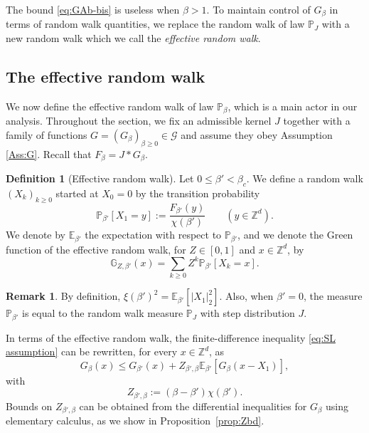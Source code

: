 \documentclass[11pt,a4paper]{article}
\numberwithin{equation}{section}
\theoremstyle{plain}
\theoremstyle{definition}
\newtheorem{Def}[Thm]{Definition}
\newtheorem{Rem}[Thm]{Remark}
\newcommand\1{\mathds{1}}
\begin{document}
The bound \eqref{eq:GAb-bis} is
useless
when $\beta>1$. To
maintain control of
$G_\beta$ in terms of random walk quantities, we replace the random walk of law $\mathbb P_J$ with a new random walk which we call the \emph{effective random walk}.


\subsection{The effective random walk}
\label{sec:strategy}

We now define the effective random walk of law $\mathbb P_\beta$,
which is a main actor in our analysis.
Throughout the section, we fix an admissible kernel $J$ together with a family of functions $G=(G_\beta)_{\beta\geq 0}\in \mathcal G$ and assume they obey Assumption \ref{Ass:G}.
Recall that $F_\beta=J*G_\beta$.


\begin{Def}[Effective random walk]\label{def: effective rw}
Let $0\leq\beta'<\beta_c$. We define a random walk $(X_k)_{k\geq 0}$ started at $X_0=0$ by the transition probability
\begin{equation}
    \mathbb P_{\beta'}[X_{1}=y]:=\frac{F_{\beta'}(y)}{\chi(\beta')}  \qquad (y\in \mathbb Z^d).
\end{equation}
We denote by $\mathbb E_{\beta'}$ the expectation with respect to $\mathbb P_{\beta'}$,
and we denote the Green function of the effective
random walk, for $Z\in [0,1]$ and $x\in \mathbb Z^d$, by
\begin{equation}
\label{eq:Green-effRW}
    \mathbb G_{Z,\beta'}(x)=\sum_{k\geq 0}Z^k \mathbb P_{\beta'}[X_k=x].
\end{equation}
\end{Def}

\begin{Rem} By definition, $\xi(\beta')^2=\mathbb E_{\beta'}[|X_1|_2^2]$.
Also, when $\beta'=0$, the measure $\mathbb P_{\beta'}$ is equal to the random walk measure $\mathbb P_J$ with step distribution $J$.
\end{Rem}

In terms of the effective random walk, the finite-difference inequality
\eqref{eq:SL assumption} can be rewritten, for every $x\in \mathbb Z^d$, as
\begin{equation}\label{eq:overview proof 0}
	G_\beta(x)\leq G_{\beta'}(x)+
    Z_{\beta',\beta}\mathbb E_{\beta'}[G_{\beta}(x-X_1)],
\end{equation}
with
\begin{equation}
	Z_{\beta',\beta}:=(\beta-\beta')\chi(\beta').
\end{equation}
Bounds on $Z_{\beta',\beta}$ can be obtained
from the differential inequalities for $G_\beta$ using elementary
calculus, as we show in Proposition~\ref{prop:Zbd}.
\end{document}
